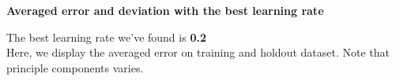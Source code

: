 \documentclass{article} %
\begin{document}
\textbf{Averaged error and deviation with the best learning rate}

The best learning rate we've found is \textbf{0.2} \\
Here, we display the averaged error on training and holdout dataset. Note that principle components varies.


\begin{figure}[htb]

    \centering

    
    

\end{figure}
\end{document}
